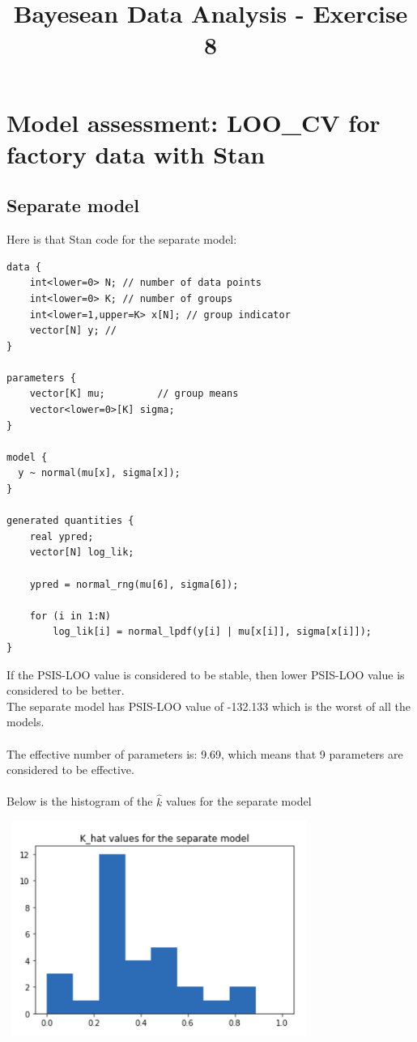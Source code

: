 \documentclass[17pt]{article}
\begin{document}
\title{{Bayesean Data Analysis - Exercise 8}}
\maketitle


\section{Model assessment: LOO\_CV for factory data with Stan}

\subsection{Separate model}
Here is that Stan code for the separate model:

\begin{lstlisting}
data {
    int<lower=0> N; // number of data points
    int<lower=0> K; // number of groups
    int<lower=1,upper=K> x[N]; // group indicator
    vector[N] y; //
}

parameters {
    vector[K] mu;         // group means
    vector<lower=0>[K] sigma;
}

model {
  y ~ normal(mu[x], sigma[x]);
}

generated quantities {
    real ypred;
    vector[N] log_lik;
    
    ypred = normal_rng(mu[6], sigma[6]);
    
    for (i in 1:N)
        log_lik[i] = normal_lpdf(y[i] | mu[x[i]], sigma[x[i]]);
}
\end{lstlisting}


If the PSIS-LOO value is considered to be stable, then lower PSIS-LOO value is considered to be better. \\
The separate model has PSIS-LOO value of -132.133 which is the worst of all the models. \\~\\

The effective number of parameters is: 9.69, which means that 9 parameters are considered to be effective. \\~\\

Below is the histogram of the $ \hat{k} $ values for the separate model

\begin{center}
\includegraphics[width=10cm, height=7cm]{separate_model.png}
\end{center}
\end{document}
